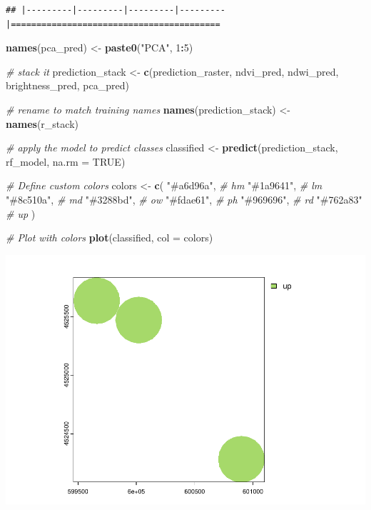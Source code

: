 \documentclass[
]{article}
\newenvironment{Shaded}{\begin{snugshade}}{\end{snugshade}}
\newcommand{\AttributeTok}[1]{\textcolor[rgb]{0.13,0.29,0.53}{#1}}
\newcommand{\CommentTok}[1]{\textcolor[rgb]{0.56,0.35,0.01}{\textit{#1}}}
\newcommand{\ConstantTok}[1]{\textcolor[rgb]{0.56,0.35,0.01}{#1}}
\newcommand{\DecValTok}[1]{\textcolor[rgb]{0.00,0.00,0.81}{#1}}
\newcommand{\FunctionTok}[1]{\textcolor[rgb]{0.13,0.29,0.53}{\textbf{#1}}}
\newcommand{\NormalTok}[1]{#1}
\newcommand{\OtherTok}[1]{\textcolor[rgb]{0.56,0.35,0.01}{#1}}
\newcommand{\SpecialCharTok}[1]{\textcolor[rgb]{0.81,0.36,0.00}{\textbf{#1}}}
\newcommand{\StringTok}[1]{\textcolor[rgb]{0.31,0.60,0.02}{#1}}
\begin{document}
\begin{verbatim}
## |---------|---------|---------|---------|=========================================                                          
\end{verbatim}

\begin{Shaded}
\begin{Highlighting}[]
\FunctionTok{names}\NormalTok{(pca\_pred) }\OtherTok{\textless{}{-}} \FunctionTok{paste0}\NormalTok{(}\StringTok{"PCA"}\NormalTok{, }\DecValTok{1}\SpecialCharTok{:}\DecValTok{5}\NormalTok{)}

\CommentTok{\# stack it}
\NormalTok{prediction\_stack }\OtherTok{\textless{}{-}} \FunctionTok{c}\NormalTok{(prediction\_raster, ndvi\_pred, ndwi\_pred, brightness\_pred, pca\_pred)}

\CommentTok{\# rename to match training names}
\FunctionTok{names}\NormalTok{(prediction\_stack) }\OtherTok{\textless{}{-}} \FunctionTok{names}\NormalTok{(r\_stack)}

\CommentTok{\# apply the model to predict classes}
\NormalTok{classified }\OtherTok{\textless{}{-}} \FunctionTok{predict}\NormalTok{(prediction\_stack, rf\_model, }\AttributeTok{na.rm =} \ConstantTok{TRUE}\NormalTok{)}

\CommentTok{\# Define custom colors}
\NormalTok{colors }\OtherTok{\textless{}{-}} \FunctionTok{c}\NormalTok{(}
  \StringTok{"\#a6d96a"}\NormalTok{,  }\CommentTok{\# hm  }
  \StringTok{"\#1a9641"}\NormalTok{,  }\CommentTok{\# lm  }
  \StringTok{"\#8c510a"}\NormalTok{,  }\CommentTok{\# md  }
  \StringTok{"\#3288bd"}\NormalTok{,  }\CommentTok{\# ow  }
  \StringTok{"\#fdae61"}\NormalTok{,  }\CommentTok{\# ph  }
  \StringTok{"\#969696"}\NormalTok{,  }\CommentTok{\# rd  }
  \StringTok{"\#762a83"}   \CommentTok{\# up  }
\NormalTok{)}



\CommentTok{\# Plot with colors}
\FunctionTok{plot}\NormalTok{(classified, }\AttributeTok{col =}\NormalTok{ colors)}
\end{Highlighting}
\end{Shaded}

\includegraphics{veg_model_new_class_files/figure-latex/unnamed-chunk-4-1.pdf}
\end{document}
